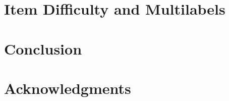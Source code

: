 \documentclass[11pt]{article}
\begin{document}


\section{Item Difficulty and Multilabels}

\section{Conclusion} %

\section*{Acknowledgments}


\end{document}
